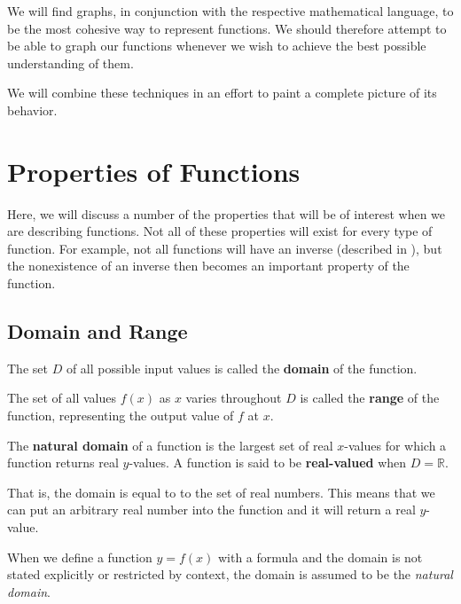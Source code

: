 We will find graphs, in conjunction with the respective mathematical language, 
to be the most cohesive way to represent functions.
We should therefore attempt to be able to graph our functions whenever we wish to achieve the best possible understanding of them.

We will combine these techniques in an effort to paint a complete picture of its 
behavior.

\section{Properties of Functions}

Here, we will discuss a number of the properties that will be of interest when we
are describing functions.
Not all of these properties will exist for every type of function.
For example, not all functions will have an inverse 
(described in ), 
but the nonexistence of an inverse then becomes an important property of the 
function. %

\subsection{Domain and Range}

\begin{defn}
    The set $D$ of all possible input values is called the \textbf{domain} of 
    the function.
\end{defn}

\begin{defn}
    The set of all values $f(x)$ as $x$ varies throughout $D$ is called 
    the \textbf{range} of the function,
    representing the output value of $f$ at $x$.
\end{defn}

\begin{defn}
    The \textbf{natural domain} of a function is the largest set of real 
    $x$-values for which a function returns real $y$-values.
    A function is said to be \textbf{real-valued} when $D = \mathbb{R}$.
\end{defn}
That is, the domain is equal to to the set of real numbers.
This means that we can put an arbitrary real number into the function and it 
will return a real $y$-value.

 \begin{remark}
     When we define a function $y=f(x)$ with a formula and the domain is not 
     stated explicitly or restricted by context, the domain is assumed to be the 
     \emph{natural domain}.
   \end{remark}

